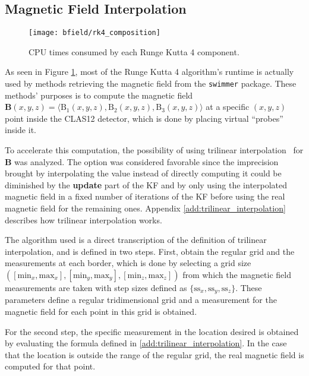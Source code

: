 \subsection{Magnetic Field Interpolation} \label{ssec:prop_magfield}
    \begin{figure}[ht] %
        \centering
        \texttt{[image: bfield/rk4\_composition]}
        \caption{\label{fig:rk4_composition} CPU times consumed by each Runge Kutta 4 component.}
    \end{figure}

As seen in Figure \ref{fig:rk4_composition}, most of the Runge Kutta 4 algorithm's runtime is actually used by methods retrieving the magnetic field from the \texttt{swimmer} package.
These methods' purposes is to compute the magnetic field $\textbf{B}(x,y,z) = \langle \operatorname{B_1}(x,y,z),\operatorname{B_2}(x,y,z),\operatorname{B_3}(x,y,z)\rangle$ at a specific $(x,y,z)$ point inside the CLAS12 detector, which is done by placing virtual ``probes'' inside it. %

To accelerate this computation, the possibility of using trilinear interpolation~\cite{bourke1999interpolation} for $\mathbf{B}$ was analyzed.
The option was considered favorable since the imprecision brought by interpolating the value instead of directly computing it could be diminished by the \textbf{update} part of the KF and by only using the interpolated magnetic field in a fixed number of iterations of the KF before using the real magnetic field for the remaining ones.
Appendix \ref{add:trilinear_interpolation} describes how trilinear interpolation works.

The algorithm used is a direct transcription of the definition of trilinear interpolation, and is defined in two steps.
First, obtain the regular grid and the measurements at each border, which is done by selecting a grid size $\left([\text{min}_x, \text{max}_x], [\text{min}_y, \text{max}_y], [\text{min}_z, \text{max}_z]\right)$ from which the magnetic field measurements are taken with step sizes defined as $\{\text{ss}_x, \text{ss}_y, \text{ss}_z\}$.
These parameters define a regular tridimensional grid and a measurement for the magnetic field for each point in this grid is obtained.

For the second step, the specific measurement in the location desired is obtained by evaluating the formula defined in \ref{add:trilinear_interpolation}.
In the case that the location is outside the range of the regular grid, the real magnetic field is computed for that point.

